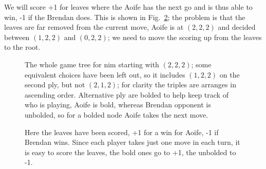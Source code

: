 \documentclass[11pt,a4paper]{scrartcl}
\begin{document}
We will score +1 for leaves where the Aoife has the next go and is
thus able to win, -1 if the Brendan does. This is shown in
Fig.~\ref{fig:nim-leaves}; the problem is that the leaves are far
removed from the current move, Aoife is at $(2,2,2)$ and decided
between $(1,2,2)$ and $(0,2,2)$; we need to move the scoring up from
the leaves to the root.

\begin{figure}
\begin{center}
\end{center}
\caption{The whole game tree for nim starting with $(2,2,2)$; some
  equivalent choices have been left out, so it includes $(1,2,2)$ on
  the second ply, but not $(2,1,2)$; for clarity the triples are
  arranges in ascending order. Alternative ply are bolded to help keep
  track of who is playing, Aoife is bold, whereas Brendan opponent is
  unbolded, so for a bolded node Aoife takes the next move. \label{fig:nim}}
\end{figure}

\begin{figure}
\begin{center}
\end{center}
\caption{Here the leaves have been scored, +1 for a win for Aoife, -1
  if Brendan wins. Since each player takes just one move in each turn,
  it is easy to score the leaves, the bold ones go to +1, the unbolded
  to -1.\label{fig:nim-leaves}}
\end{figure}
\end{document}
